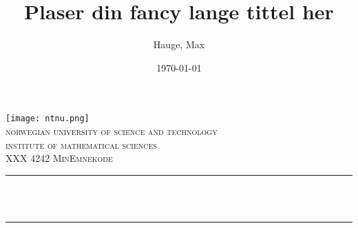 
\begin{titlepage}
	\title{Plaser din fancy lange tittel her}
	\author{Hauge, Max}
	\date{\today}

	\makeatletter
	\let\thetitle\@title
	\let\theauthor\@author
	\let\thedate\@date
	\makeatother


	\centering
    \vspace*{0.5 cm}
    \texttt{[image: ntnu.png]}\\[1.0 cm]
    
    \textsc{\LARGE norwegian university of science and technology}\\[1.0 cm]
    
    \textsc{\Large institute of mathematical sciences}\\[0.5 cm]
	
	\textsc{\large XXX 4242 MinEmnekode}\\[0.5 cm]
	
	\rule{\linewidth}{0.2 mm} \\[0.4 cm]
	{ \LARGE \textbf{\uppercase{\thetitle}}}\\
	\rule{\linewidth}{0.2 mm} \\[1.5 cm]
	
	
	{\large \thedate}\\[2 cm]
 
	\vfill
	
\end{titlepage}